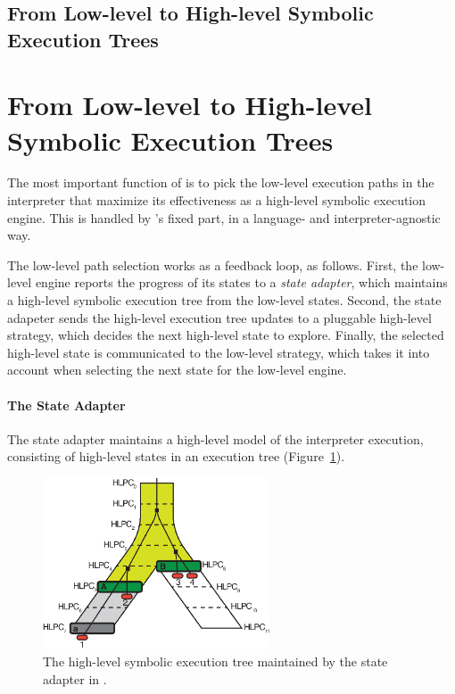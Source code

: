 \subsection{From Low-level to High-level Symbolic Execution Trees}


\section{From Low-level to High-level Symbolic Execution Trees}

The most important function of \chef is to pick the low-level execution paths in the interpreter that maximize its effectiveness as a high-level symbolic execution engine.
%
This is handled by \chef's fixed part, in a language- and interpreter-agnostic way.

The low-level path selection works as a feedback loop, as follows.
%
First, the low-level engine reports the progress of its states to a \emph{state adapter}, which maintains a high-level symbolic execution tree from the low-level states.
%
Second, the state adapeter sends the high-level execution tree updates to a pluggable high-level strategy, which decides the next high-level state to explore.
%
Finally, the selected high-level state is communicated to the low-level strategy, which takes it into account when selecting the next state for the low-level engine.

\paragraph{The State Adapter}

The state adapter maintains a high-level model of the interpreter execution, consisting of high-level states in an execution tree (Figure~\ref{fig:chef:hl-tree}).

\begin{figure}
  \centering
  \includegraphics[width=0.6\textwidth]{figures/chef/hl-tree}
  \caption{The high-level symbolic execution tree maintained by the state adapter in \chef.}
  \label{fig:chef:hl-tree}
\end{figure}

